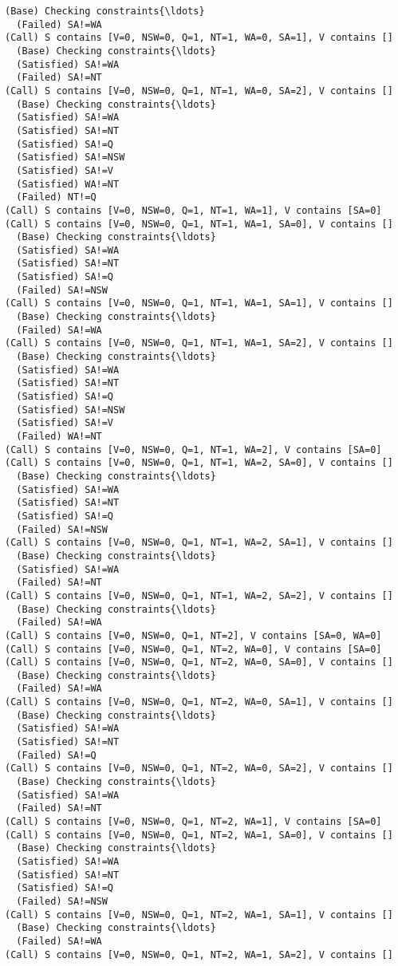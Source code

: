 \documentclass[11pt]{article}
\begin{document}
\begin{Verbatim}[commandchars=\\\{\}]
  (Base) Checking constraints{\ldots}
  (Failed) SA!=WA
(Call) S contains [V=0, NSW=0, Q=1, NT=1, WA=0, SA=1], V contains []
  (Base) Checking constraints{\ldots}
  (Satisfied) SA!=WA
  (Failed) SA!=NT
(Call) S contains [V=0, NSW=0, Q=1, NT=1, WA=0, SA=2], V contains []
  (Base) Checking constraints{\ldots}
  (Satisfied) SA!=WA
  (Satisfied) SA!=NT
  (Satisfied) SA!=Q
  (Satisfied) SA!=NSW
  (Satisfied) SA!=V
  (Satisfied) WA!=NT
  (Failed) NT!=Q
(Call) S contains [V=0, NSW=0, Q=1, NT=1, WA=1], V contains [SA=0]
(Call) S contains [V=0, NSW=0, Q=1, NT=1, WA=1, SA=0], V contains []
  (Base) Checking constraints{\ldots}
  (Satisfied) SA!=WA
  (Satisfied) SA!=NT
  (Satisfied) SA!=Q
  (Failed) SA!=NSW
(Call) S contains [V=0, NSW=0, Q=1, NT=1, WA=1, SA=1], V contains []
  (Base) Checking constraints{\ldots}
  (Failed) SA!=WA
(Call) S contains [V=0, NSW=0, Q=1, NT=1, WA=1, SA=2], V contains []
  (Base) Checking constraints{\ldots}
  (Satisfied) SA!=WA
  (Satisfied) SA!=NT
  (Satisfied) SA!=Q
  (Satisfied) SA!=NSW
  (Satisfied) SA!=V
  (Failed) WA!=NT
(Call) S contains [V=0, NSW=0, Q=1, NT=1, WA=2], V contains [SA=0]
(Call) S contains [V=0, NSW=0, Q=1, NT=1, WA=2, SA=0], V contains []
  (Base) Checking constraints{\ldots}
  (Satisfied) SA!=WA
  (Satisfied) SA!=NT
  (Satisfied) SA!=Q
  (Failed) SA!=NSW
(Call) S contains [V=0, NSW=0, Q=1, NT=1, WA=2, SA=1], V contains []
  (Base) Checking constraints{\ldots}
  (Satisfied) SA!=WA
  (Failed) SA!=NT
(Call) S contains [V=0, NSW=0, Q=1, NT=1, WA=2, SA=2], V contains []
  (Base) Checking constraints{\ldots}
  (Failed) SA!=WA
(Call) S contains [V=0, NSW=0, Q=1, NT=2], V contains [SA=0, WA=0]
(Call) S contains [V=0, NSW=0, Q=1, NT=2, WA=0], V contains [SA=0]
(Call) S contains [V=0, NSW=0, Q=1, NT=2, WA=0, SA=0], V contains []
  (Base) Checking constraints{\ldots}
  (Failed) SA!=WA
(Call) S contains [V=0, NSW=0, Q=1, NT=2, WA=0, SA=1], V contains []
  (Base) Checking constraints{\ldots}
  (Satisfied) SA!=WA
  (Satisfied) SA!=NT
  (Failed) SA!=Q
(Call) S contains [V=0, NSW=0, Q=1, NT=2, WA=0, SA=2], V contains []
  (Base) Checking constraints{\ldots}
  (Satisfied) SA!=WA
  (Failed) SA!=NT
(Call) S contains [V=0, NSW=0, Q=1, NT=2, WA=1], V contains [SA=0]
(Call) S contains [V=0, NSW=0, Q=1, NT=2, WA=1, SA=0], V contains []
  (Base) Checking constraints{\ldots}
  (Satisfied) SA!=WA
  (Satisfied) SA!=NT
  (Satisfied) SA!=Q
  (Failed) SA!=NSW
(Call) S contains [V=0, NSW=0, Q=1, NT=2, WA=1, SA=1], V contains []
  (Base) Checking constraints{\ldots}
  (Failed) SA!=WA
(Call) S contains [V=0, NSW=0, Q=1, NT=2, WA=1, SA=2], V contains []

\end{Verbatim}
\end{document}
